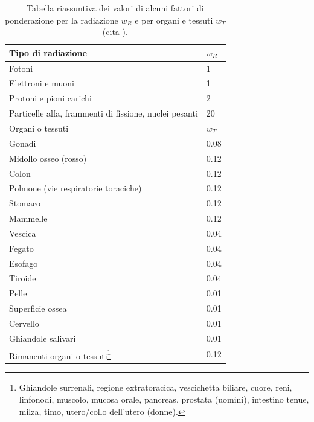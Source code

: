 \documentclass[12pt,a4paper,twoside]{report}
\begin{document}
	\begin{table}[H]
		\begin{minipage}{\textwidth}
			\centering
			\begin{tabular}{ |m{9cm}||m{3cm}| }
				\hline
				Tipo di radiazione & $w_R$ \\
				\hline\hline
				Fotoni & 1\\
				\hline
				Elettroni e muoni & 1\\
				\hline
				Protoni e pioni carichi & 2\\
				\hline
				Particelle alfa, frammenti di fissione, nuclei pesanti & 20\\
				\hline\hline
				Organi o tessuti & $w_T$\\
				\hline\hline
				Gonadi & 0.08 \\
				\hline
				Midollo osseo (rosso) & 0.12\\
				\hline
				Colon & 0.12\\
				\hline
				Polmone (vie respiratorie toraciche) & 0.12\\
				\hline
				Stomaco & 0.12\\
				\hline
				Mammelle & 0.12\\
				\hline
				Vescica & 0.04\\
				\hline
				Fegato & 0.04\\
				\hline
				Esofago & 0.04\\
				\hline
				Tiroide & 0.04\\
				\hline
				Pelle & 0.01\\
				\hline
				Superficie ossea & 0.01\\
				\hline
				Cervello & 0.01\\
				\hline
				Ghiandole salivari & 0.01\\
				\hline
				Rimanenti organi o tessuti\footnote{Ghiandole surrenali, regione extratoracica, vescichetta biliare, cuore, reni, linfonodi, muscolo, mucosa orale, pancreas, prostata (uomini), intestino tenue, milza, timo, utero/collo dell'utero (donne).} & 0.12\\
				\hline
			\end{tabular}
		\end{minipage}
		\caption{Tabella riassuntiva dei valori di alcuni fattori di ponderazione per la radiazione $w_R$ e per organi e tessuti $w_T$ (cita
				).}
		\label{tab:w_factor}
	\end{table}
	
\end{document}
